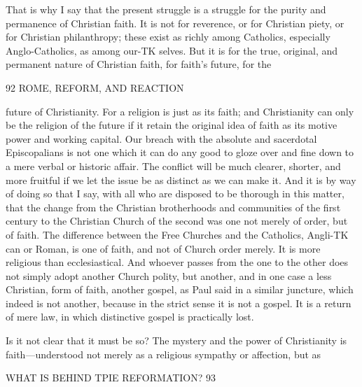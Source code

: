 \documentclass[12pt,a5paper,oneside]{book}
\begin{document}
That is why I say that the present struggle is a 
struggle for the purity and permanence of Christian 
faith. It is not for reverence, or for Christian piety, or 
for Christian philanthropy; these exist as richly among 
Catholics, especially Anglo-Catholics, as among our-TK
selves. But it is for the true, original, and permanent 
nature of Christian faith, for faith's future, for the 



92 ROME, REFORM, AND REACTION 

future of Christianity. For a religion is just as its 
faith; and Christianity can only be the religion of the 
future if it retain the original idea of faith as its motive 
power and working capital. Our breach with the 
absolute and sacerdotal Episcopalians is not one which 
it can do any good to gloze over and fine down to a 
mere verbal or historic affair. The conflict will be 
much clearer, shorter, and more fruitful if we let the 
issue be as distinct as we can make it. And it is by 
way of doing so that I say, with all who are disposed 
to be thorough in this matter, that the change from 
the Christian brotherhoods and communities of the first 
century to the Christian Church of the second was 
one not merely of order, but of faith. The difference 
between the Free Churches and the Catholics, Angli-TK
can or Roman, is one of faith, and not of Church 
order merely. It is more religious than ecclesiastical. 
And whoever passes from the one to the other does 
not simply adopt another Church polity, but another, 
and in one case a less Christian, form of faith, another 
gospel, as Paul said in a similar juncture, which 
indeed is not another, because in the strict sense it is 
not a gospel. It is a return of mere law, in which 
distinctive gospel is practically lost. 

Is it not clear that it must be so? The mystery 
and the power of Christianity is faith---understood not 
merely as a religious sympathy or affection, but as 



WHAT IS BEHIND TPIE REFORMATION? 93 
\end{document}
